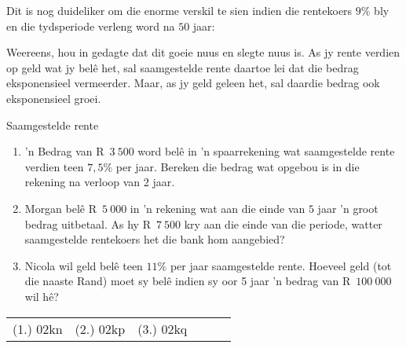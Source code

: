 Dit is nog duideliker om die enorme verskil te sien indien die rentekoers $9\%$ bly en die tydsperiode verleng word na $50$ jaar:\\

\begin{figure}[H]
    \begin{center}
	\label{FG:fig:SI10}
    \end{center}
\end{figure}

Weereens, hou in gedagte dat dit goeie nuus en slegte nuus is. As jy rente verdien op geld wat jy belê het,
sal saamgestelde rente daartoe lei dat die bedrag eksponensieel vermeerder. Maar, as jy geld geleen het, sal
daardie bedrag ook eksponensieel groei.


\begin{exercises}{Saamgestelde rente}
{
    \begin{enumerate}[label=\textbf{\arabic*}.]
	\item ’n Bedrag van R~$3~500$ word belê in ’n spaarrekening wat saamgestelde rente verdien teen $7,5\%$ per jaar.
Bereken die bedrag wat opgebou is in die rekening na verloop van 2 jaar.

	\item Morgan bel\^e R~$5~000$ in 'n rekening wat aan die einde van $5$ jaar 'n groot bedrag uitbetaal. As hy R~$7~500$ kry aan die einde van die periode, watter saamgestelde rentekoers het die bank hom aangebied?

	\item Nicola wil geld belê teen  $11\%$ per jaar saamgestelde rente. Hoeveel geld (tot die naaste Rand) moet sy belê
indien sy oor 5 jaar ’n bedrag van R~$100~000$ wil hê?
    \end{enumerate}

\par \practiceinfo
\par \begin{tabular}[h]{cccccc}
(1.)	02kn	&
(2.)	02kp	&
(3.)	02kq	&
\end{tabular}
}
\end{exercises}




